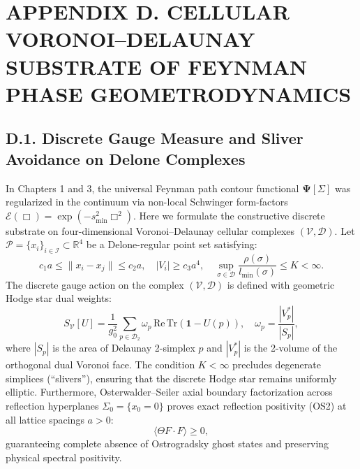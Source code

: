 \clearpage
\section*{APPENDIX D. CELLULAR VORONOI--DELAUNAY SUBSTRATE OF FEYNMAN PHASE GEOMETRODYNAMICS}
\label{sec:appendix_D}

\subsection*{D.1. Discrete Gauge Measure and Sliver Avoidance on Delone Complexes}
In Chapters 1 and 3, the universal Feynman path contour functional $\mathbf{\Psi}[\Sigma]$ was regularized in the continuum via non-local Schwinger form-factors $\mathcal{E}(\Box) = \exp(-s_{\min}^2 \Box^2)$. Here we formulate the constructive discrete substrate on four-dimensional Voronoi--Delaunay cellular complexes $(\mathcal{V}, \mathcal{D})$. Let $\mathcal{P} = \{x_i\}_{i \in \mathcal{I}} \subset \mathbb{R}^4$ be a Delone-regular point set satisfying:
\begin{equation}\label{eq:D.1}\tag{D.1}
c_1 a \le \|x_i - x_j\| \le c_2 a, \quad |V_i| \ge c_3 a^4, \quad \sup_{\sigma \in \mathcal{D}} \frac{\rho(\sigma)}{l_{\min}(\sigma)} \le K < \infty.
\end{equation}
The discrete gauge action on the complex $(\mathcal{V}, \mathcal{D})$ is defined with geometric Hodge star dual weights:
\begin{equation}\label{eq:D.2}\tag{D.2}
S_{\mathcal{V}}[U] = \frac{1}{g_0^2} \sum_{p \in \mathcal{D}_2} \omega_p \, \mathrm{Re}\,\mathrm{Tr}\left( \mathbf{1} - U(p) \right), \quad \omega_p = \frac{|V_p^*|}{|S_p|},
\end{equation}
where $|S_p|$ is the area of Delaunay 2-simplex $p$ and $|V_p^*|$ is the 2-volume of the orthogonal dual Voronoi face. The condition $K < \infty$ precludes degenerate simplices (``slivers''), ensuring that the discrete Hodge star remains uniformly elliptic. Furthermore, Osterwalder--Seiler axial boundary factorization across reflection hyperplanes $\Sigma_0 = \{x_0 = 0\}$ proves exact reflection positivity (OS2) at all lattice spacings $a > 0$:
\begin{equation}\label{eq:D.3}\tag{D.3}
\langle \Theta F \cdot F \rangle \ge 0,
\end{equation}
guaranteeing complete absence of Ostrogradsky ghost states and preserving physical spectral positivity.

